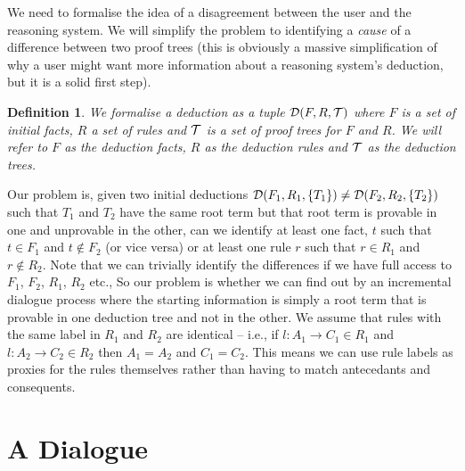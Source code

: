 \documentclass{blue-book}
\newtheorem{definition}{Definition}
\newcommand{\drule}[3]{\ensuremath{#1:#2 \rightarrow #3}}
\newcommand{\deduction}[3]{\ensuremath{{\cal D}(#1, #2, #3)}}
\begin{document}
We need to formalise the idea of a disagreement between the user and the reasoning system.  We will simplify the problem to identifying a \emph{cause} of a difference between two proof trees (this is obviously a massive simplification of why a user might want more information about a reasoning system's deduction, but it is a solid first step).

\begin{definition}
We formalise a deduction as a tuple $\deduction{F}{R}{{\cal  T}}$ where $F$ is a set of initial facts, $R$ a set of rules and ${\cal T}$ is a set of proof trees for $F$ and $R$.  We will refer to $F$ as the \emph{deduction facts}, $R$ as the \emph{deduction rules} and ${\cal T}$ as the \emph{deduction trees}.
\end{definition}

Our problem is, given two initial deductions $\deduction{F_1}{R_1}{\{T_1\}} \neq \deduction{F_2}{R_2}{\{T_2\}}$ such that $T_1$ and $T_2$ have the same root term but that root term is provable in one and unprovable in the other, can we identify at least one fact, $t$ such that $t \in F_1$ and $t \not\in F_2$ (or vice versa) or at least one rule $r$ such that $r \in R_1$ and $r\not\in R_2$.  Note that we can trivially identify the differences if we have full access to $F_1$, $F_2$, $R_1$, $R_2$ etc., So our problem is whether we can find out by an incremental dialogue process where the starting information is simply a root term that is provable in one deduction tree and not in the other.  We assume that rules with the same label in $R_1$ and $R_2$ are identical -- i.e., if $\drule{l}{A_1}{C_1} \in R_1$ and $\drule{l}{A_2}{C_2} \in R_2$ then $A_1 = A_2$ and $C_1 = C_2$.  This means we can use rule labels as proxies for the rules themselves rather than having to match antecedants and consequents.

\section{A Dialogue}
\end{document}
